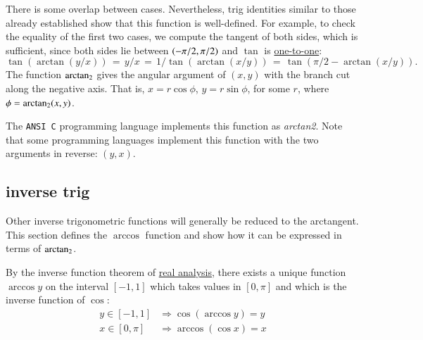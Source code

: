 There is some overlap between cases. Nevertheless, trig identities similar to those already established show
that this function is well-defined.  For example, to check the equality of the
first two cases, we compute the tangent of both sides, which is sufficient, since both sides lie between $(-\pi/2,\pi/2)$ and $\tan$ is \hyperref[lemma:tan-monotone]{one-to-one}:
\begin{displaymath}
\tan(\arctan(y/x)) \hyperref[def:arctan]{\,=\,} y/x \hyperref[def:arctan]{\,=\,} 
1/\tan(\arctan(x/y)) \hyperref[lemma:cos-sin]{\,=\,} \tan(\pi/2 - \arctan(x/y)).
\end{displaymath}
The function ${\operatorname{arctan_2}}$ gives the
angular argument of $(x,y)$ with the branch cut along the negative axis.
That is, $x = r\cos\phi$, $y=r\sin\phi$, for some $r$, where $\phi={\operatorname{arctan_2}}(x,y)$.

The {\tt ANSI C} programming language implements this function as {\it arctan2}. 
Note that some programming languages implement this function with the two arguments in reverse: $(y,x)$.
%
%
%
%


\subsection{inverse trig}
%
Other inverse trigonometric functions will generally be reduced to
the arctangent.  This section defines the $\arccos$ function and show how it can be expressed in terms of ${\operatorname{arctan_2}}$.

\begin{definition}[arccos]\label{def:arccos}
By the inverse function theorem of \hyperref[back:analysis]{real analysis}, there exists a unique function
$\arccos y$ on the interval $[-1,1]$ which takes
values in $[0,\pi]$ and which is the inverse function of $\cos$:
    \begin{displaymath}\begin{array}{lll}
        y\in [-1,1] &\Rightarrow \cos(\arccos y) = y\\
        x\in[0,\pi] &\Rightarrow \arccos(\cos x) = x
    \end{array}\end{displaymath}
%
%
\end{definition}


